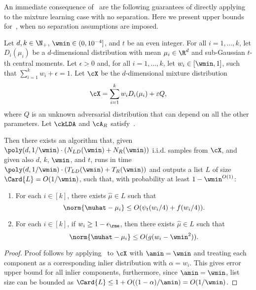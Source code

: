 An immediate consequence of~ are the following guarantees of directly applying~ to the mixture learning case with no separation.
Here we present upper bounds for~, when no separation assumptions are imposed.

\begin{corollary}[]
    \label{thm:no-sep-technical}
Let $d, k \in \N_+$, $\wmin \in (0, 10^{-4}]$, and $t$ be an even integer. 
For all $i = 1, \ldots, k$, let $D_i(\mu_i)$ be a $d$-dimensional distribution with mean $\mu_i \in \R^d$ and sub-Gaussian $t$-th central moments.
Let $\epsilon > 0$ and, for all $i = 1, \ldots, k$, let $w_i \in [\wmin, 1]$, such that $\sum_{i=1}^k w_i + \epsilon = 1$.
Let $\cX$ be the $d$-dimensional mixture distribution 
\[\cX = \sum_{i=1}^k w_i D_i(\mu_i) + \varepsilon Q,\]
where $Q$ is an unknown adversarial distribution that can depend on all the other parameters. Let \(\ckLDA\) and \(\cA_R\) satisfy~.

Then there exists an algorithm that, given ${\poly(d, 1/\wmin) \cdot (N_{LD}(\wmin) + N_R(\wmin))}$ i.i.d. samples from $\cX$, and given also $d$, $k$, $\wmin$, and $t$, runs in time ${\poly(d, 1/\wmin) \cdot (T_{LD}(\wmin) + T_R(\wmin))}$ and outputs a list \(L\) of size \(\Card{L} = O(1 / \wmin)\), such that, with probability at least \(1 - \wmin^{O(1)}\):
\begin{enumerate}
    \item For each $i \in [k]$, there exists $\hat\mu \in L$ such that
    \[\norm{\muhat - \mu_i} \leq O(\psi_t(w_i/4)+f(w_i/4)).\]
    \item For each $i \in [k]$, if $w_i \geq 1-\epsilon_{\rme}$, then there exists $\hat\mu \in L$ such that
    \[\norm{\muhat - \mu_i} \leq O(g(w_i -\wmin^2)).\]
\end{enumerate}
\end{corollary}
\begin{proof}
    Proof follows by applying~ to \(\cX\) with \(\amin = \wmin\) and treating each component as a corresponding inlier distribution with \(\alpha = w_i\). This gives error upper bound for all inlier components, furthermore, since \(\amin = \wmin\), list size can be bounded as \(\Card{L} \leq 1 + O((1 - \alpha) / \amin) = O(1 / \wmin)\).
\end{proof}

